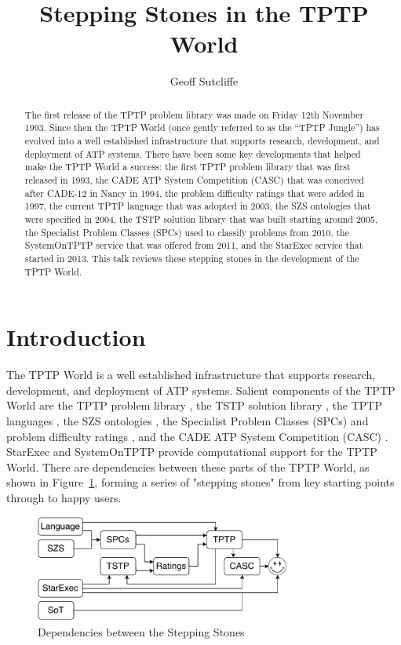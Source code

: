 \documentclass{easychair}
\title{Stepping Stones in the TPTP World}
\author{
  Geoff Sutcliffe
}
\institute{
  University of Miami,
  Miami, USA\\
  \email{geoff@cs.miami.edu}\\
}
\begin{document}
\maketitle

\begin{abstract}
The first release of the TPTP problem library was made on Friday 12th November 1993. 
Since then the TPTP World (once gently referred to as the ``TPTP Jungle'') has evolved into a 
well established infrastructure that supports research, development, and deployment of ATP systems.
There have been some key developments that helped make the TPTP World a success: 
the first TPTP problem library that was first released in 1993, 
the CADE ATP System Competition (CASC) that was conceived after CADE-12 in Nancy in 1994, 
the problem difficulty ratings that were added in 1997, 
the current TPTP language that was adopted in 2003, 
the SZS ontologies that were specified in 2004, 
the TSTP solution library that was built starting around 2005, 
the Specialist Problem Classes (SPCs) used to classify problems from 2010, 
the SystemOnTPTP service that was offered from 2011, 
and 
the StarExec service that started in 2013. 
This talk reviews these stepping stones in the development of the TPTP World.
\end{abstract}
\section{Introduction}
\label{Introduction}

The TPTP World \cite{Sut10,Sut17} is a well established infrastructure that supports research, 
development, and deployment of ATP systems.
Salient components of the TPTP World are
the TPTP problem library \cite{Sut09}, 
the TSTP solution library \cite{Sut10}, 
the TPTP languages \cite{SS+06}, 
the SZS ontologies \cite{Sut08-KEAPPA},
the Specialist Problem Classes (SPCs) and problem difficulty ratings \cite{SS01},
and the CADE ATP System Competition (CASC) \cite{Sut16}.
StarExec \cite{SST14} and SystemOnTPTP \cite{Sut00-CADE-17} provide computational support for
the TPTP World.
There are dependencies between these parts of the TPTP World, as shown in 
Figure~\ref{Dependencies}, forming a series of "stepping stones" from key starting points
through to happy users.

\begin{figure}[htbp]
\centering
\includegraphics[width=0.75\textwidth]{Dependencies.pdf}
\caption{Dependencies between the Stepping Stones}
\label{Dependencies}
\end{figure}
\end{document}
